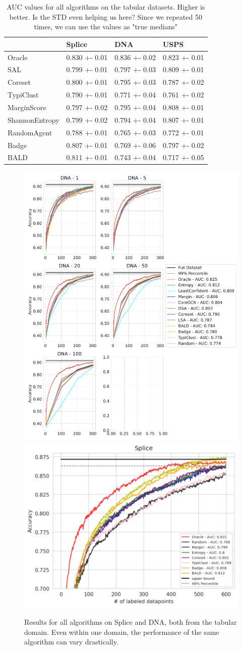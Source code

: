 \documentclass[]{article}
\begin{document}
\begin{table}[]
	\centering
	\begin{tabular}{l|lll}
		& Splice        & DNA           & USPS          \\
		\hline
		Oracle          & 0.830 +- 0.01 & 0.836 +- 0.02 & 0.823 +- 0.01 \\
		SAL & 0.799 +- 0.01 & 0.797 +- 0.03 & 0.809 +- 0.01 \\
		Coreset & 0.800 +- 0.01 & 0.795 +- 0.03 & 0.787 +- 0.02 \\
		TypiClust       & 0.790 +- 0.01 & 0.771 +- 0.04 & 0.761 +- 0.02 \\
		MarginScore     & 0.797 +- 0.02 & 0.795 +- 0.04 & 0.808 +- 0.01 \\
		ShannonEntropy  & 0.799 +- 0.02 & 0.794 +- 0.04 & 0.807 +- 0.01 \\
		RandomAgent     & 0.788 +- 0.01 & 0.765 +- 0.03 & 0.772 +- 0.01 \\
		Badge           & 0.807 +- 0.01 & 0.769 +- 0.06 & 0.797 +- 0.02 \\
		BALD            & 0.811 +- 0.01 & 0.743 +- 0.04 & 0.717 +- 0.05
	\end{tabular}
	\caption{AUC values for all algorithms on the tabular datasets. Higher is better.
	{\color{red}Is the STD even helping us here? Since we repeated 50 times, we can use the values as "true medians"} }
\end{table}
%
\begin{figure}
	\centering
	\includegraphics[width=0.49\linewidth]{img/eval_dna}
	\includegraphics[width=0.49\linewidth]{img/eval_splice.png}
	\caption{Results for all algorithms on Splice and DNA, both from the tabular domain. Even within one domain, the performance of the same algorithm can vary drastically.}
	\label{fig:eval_vector}
\end{figure}
\end{document}
